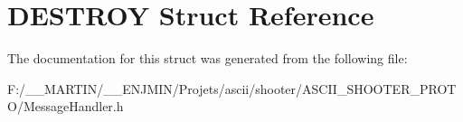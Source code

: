 \hypertarget{struct_d_e_s_t_r_o_y}{}\section{D\+E\+S\+T\+R\+OY Struct Reference}
\label{struct_d_e_s_t_r_o_y}


The documentation for this struct was generated from the following file\+:\begin{DoxyCompactItemize}
\item 
F\+:/\+\_\+\+\_\+\+M\+A\+R\+T\+I\+N/\+\_\+\+\_\+\+E\+N\+J\+M\+I\+N/\+Projets/ascii/shooter/\+A\+S\+C\+I\+I\+\_\+\+S\+H\+O\+O\+T\+E\+R\+\_\+\+P\+R\+O\+T\+O/Message\+Handler.\+h\end{DoxyCompactItemize}
